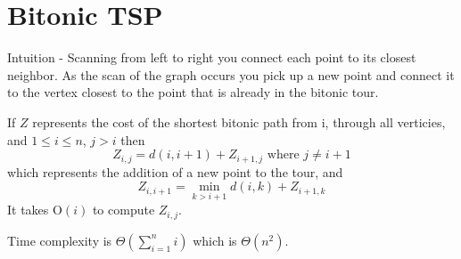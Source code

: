 \documentclass[12pt,twoside,letterpaper]{article}
\begin{document}
\section*{Bitonic TSP}
Intuition - Scanning from left to right you connect each point to its closest neighbor. As the scan of the graph occurs you pick up a new point and connect it to the vertex closest to the point that is already in the bitonic tour.

If $Z$ represents the cost of the shortest bitonic path from i, through all verticies, and $1 \le i \le n$, $j > i$ then
$$Z_{i,j} = d(i,i+1) + Z_{i+1,j} \textrm{ where } j \ne i+1$$
which represents the addition of a new point to the tour, and
$$Z_{i,i+1} = \min_{k>i+1}{d(i,k) + Z_{i+1,k}}$$
It takes $\textrm{O}(i)$ to compute $Z_{i,j}$. 

Time complexity is $\Theta(\sum_{i=1}^n i)$ which is $\Theta(n^2)$.
\end{document}
